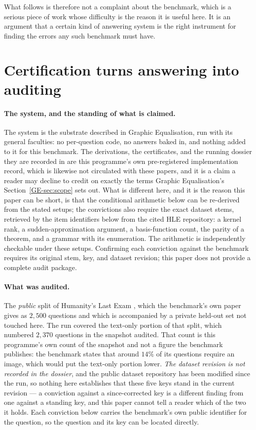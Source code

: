 \documentclass[11pt,a4paper]{article}
\theoremstyle{remark}
\begin{document}
What follows is therefore not a complaint about the benchmark, which is a serious piece of work whose
difficulty is the reason it is useful here. It is an argument that a certain kind of answering system
is the right instrument for finding the errors any such benchmark must have.

\section{Certification turns answering into auditing}\label{sec:audit}
\paragraph{The system, and the standing of what is claimed.}
The system is the substrate described in Graphic Equalisation, run with its general faculties: no
per-question code, no answers baked in, and nothing added to it for this benchmark. The derivations,
the certificates, and the running dossier they are recorded in are this programme's own
pre-registered implementation record, which is likewise not circulated with these papers, and it is a
claim a reader may decline to credit on exactly the terms Graphic Equalisation's
Section~\ref{GE-sec:scope} sets out. What is different here, and it is the reason this paper can be
short, is that the conditional arithmetic below can be re-derived from the stated setups; the convictions also require the exact dataset stems, retrieved by the item identifiers below from the cited HLE repository: a kernel rank, a
sudden-approximation argument, a basis-function count, the parity of a theorem, and a grammar with
its enumeration. The arithmetic is independently checkable under these setups. Confirming each conviction against the benchmark requires its original stem, key, and dataset revision; this paper does not provide a complete audit package.

\paragraph{What was audited.}
The \emph{public} split of Humanity's Last Exam \citep{phan2025}, which the benchmark's own paper
gives as $2{,}500$ questions and which is accompanied by a private held-out set not touched here. The
run covered the text-only portion of that split, which numbered $2{,}370$ questions in the snapshot
audited. That count is this programme's own count of the snapshot and not a figure the benchmark
publishes: the benchmark states that around $14\%$ of its questions require an image, which would put
the text-only portion lower. \emph{The dataset revision is not recorded in the dossier}, and the
public dataset repository has been modified since the run, so nothing here establishes that these
five keys stand in the current revision --- a conviction against a since-corrected key is a different
finding from one against a standing key, and this paper cannot tell a reader which of the two it
holds. Each conviction below carries the benchmark's own public identifier for the question, so the
question and its key can be located directly.
\end{document}
